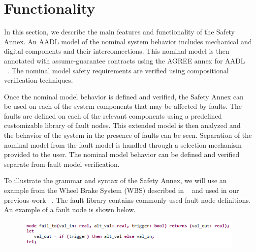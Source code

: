 \section{Functionality}
In this section, we describe the main features and functionality of the Safety Annex.
%
An AADL model of the nominal system behavior includes mechanical and digital components and their interconnections. This nominal model is then annotated with assume-guarantee contracts using the AGREE annex for AADL ~\cite{NFM2012:CoGaMiWhLaLu}. The nominal model safety requirements are verified using compositional verification techniques.

Once the nominal model behavior is defined and verified, the Safety Annex can be used on each of the system components that may be affected by faults. The faults are defined on each of the relevant components using a predefined customizable library of fault nodes. This extended model is then analyzed and the behavior of the system in the presence of faults can be seen. Separation of the nominal model from the fault model is handled through a selection mechanism provided to the user. The nominal model behavior can be defined and verified separate from fault model verification.

To illustrate the grammar and syntax of the Safety Annex, we will use an example from the Wheel Brake System (WBS) described in ~\cite{AIR6110} and used in our previous work ~\cite{Stewart17:IMBSA}.
The fault library contains commonly used fault node definitions. An example of a fault node is shown below.
\begin{figure}[h!]
\vspace{-0.19in}
\begin{center}
\includegraphics[trim=0 9 0 5,clip,width=1.0\textwidth]{images/faultNode.png}
\end{center}
\vspace{-0.4in}
\end{figure}

